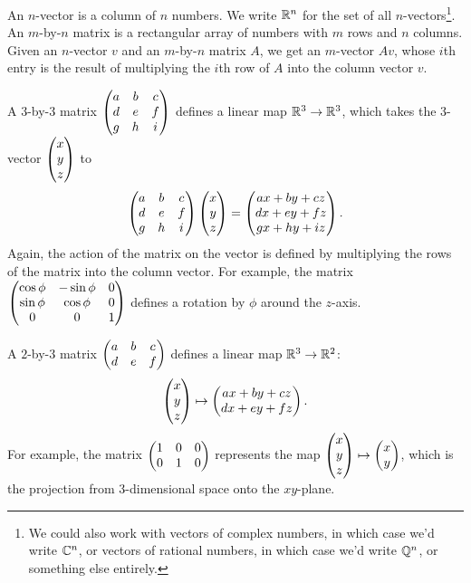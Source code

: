 \documentclass{article}
\begin{document}
\begin{Definition}
An \(n\)-vector is a column of \(n\) numbers. We write \(\mathbb{R}^n\) for
the set of all \(n\)-vectors\footnote{We could also work with
vectors of complex numbers, in which case we'd write \(\mathbb{C}^n\), or
vectors of rational numbers, in which case we'd write \(\mathbb{Q}^n\), or
something else entirely.}. An \(m\)-by-\(n\) matrix is a rectangular
array of numbers with \(m\) rows and \(n\) columns. Given an
\(n\)-vector \(v\) and an \(m\)-by-\(n\) matrix \(A\), we get an
\(m\)-vector \(Av\), whose \(i\)th entry is the result of
multiplying the \(i\)th row of \(A\) into the column vector \(v\).


\end{Definition}
\begin{Example}
A \(3\)-by-\(3\) matrix \(\begin{pmatrix} a & b & c \\ d & e & f \\ g & h &
i\end{pmatrix}\) defines a linear map \(\mathbb{R}^3\to\mathbb{R}^3\), which takes the
3-vector \(\begin{pmatrix} x \\ y \\ z\end{pmatrix}\) to \[\begin{pmatrix} a & b & c \\ d & e & f \\ g
& h & i\end{pmatrix}\begin{pmatrix} x \\ y\\ z\end{pmatrix}=\begin{pmatrix} ax+by+cz\\ dx+ey+fz\\ gx+hy+iz\end{pmatrix}.\]
Again, the action of the matrix on the vector is defined by
multiplying the rows of the matrix into the column vector. For
example, the matrix \(\begin{pmatrix} \cos\phi & -\sin\phi & 0 \\ \sin\phi &
\cos\phi & 0 \\ 0 & 0 & 1\end{pmatrix}\) defines a rotation by \(\phi\) around
the \(z\)-axis.


\end{Example}
\begin{Example}
A \(2\)-by-\(3\) matrix \(\begin{pmatrix} a & b & c \\ d & e & f\end{pmatrix}\) defines a
linear map \(\mathbb{R}^3\to\mathbb{R}^2\): \[\begin{pmatrix} x \\ y\\ z\end{pmatrix}\mapsto \begin{pmatrix}
ax+by+cz\\ dx+ey+fz\end{pmatrix}.\] For example, the matrix \(\begin{pmatrix} 1 & 0 & 0
\\ 0 & 1 & 0\end{pmatrix}\) represents the map \(\begin{pmatrix} x \\ y \\ z\end{pmatrix}\mapsto\begin{pmatrix}
x \\ y\end{pmatrix}\), which is the projection from 3-dimensional space onto
the \(xy\)-plane.


\end{Example}
\end{document}
